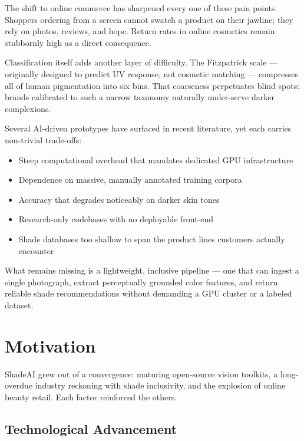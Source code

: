 The shift to online commerce has sharpened every one of these pain points. Shoppers ordering from a screen cannot swatch a product on their jawline; they rely on photos, reviews, and hope. Return rates in online cosmetics remain stubbornly high as a direct consequence.

\vspace{0.5cm}

Classification itself adds another layer of difficulty. The Fitzpatrick scale — originally designed to predict UV response, not cosmetic matching — compresses all of human pigmentation into six bins. That coarseness perpetuates blind spots: brands calibrated to such a narrow taxonomy naturally under-serve darker complexions.

\vspace{0.5cm}

Several AI-driven prototypes have surfaced in recent literature, yet each carries non-trivial trade-offs:

\begin{itemize}
    \item Steep computational overhead that mandates dedicated GPU infrastructure
    \item Dependence on massive, manually annotated training corpora
    \item Accuracy that degrades noticeably on darker skin tones
    \item Research-only codebases with no deployable front-end
    \item Shade databases too shallow to span the product lines customers actually encounter
\end{itemize}

What remains missing is a lightweight, inclusive pipeline — one that can ingest a single photograph, extract perceptually grounded color features, and return reliable shade recommendations without demanding a GPU cluster or a labeled dataset.

\section{Motivation}

ShadeAI grew out of a convergence: maturing open-source vision toolkits, a long-overdue industry reckoning with shade inclusivity, and the explosion of online beauty retail. Each factor reinforced the others.

\subsection{Technological Advancement}


